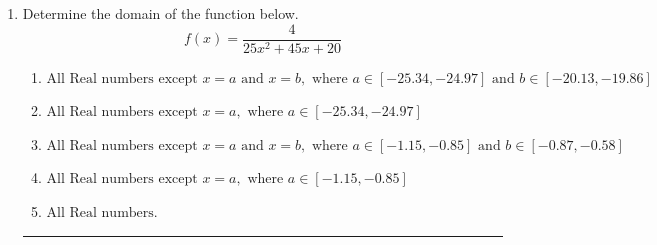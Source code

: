 \documentclass[14pt]{extbook}
\newcommand{\litem}[1]{\item#1\hspace*{-1cm}\rule{\textwidth}{0.4pt}}
\begin{document}
\begin{enumerate}
{\begin{enumerate}[label=\Alph*.]
\end{enumerate} }
\litem{
Determine the domain of the function below.\[ f(x) = \frac{4}{25x^{2} +45 x + 20} \]\begin{enumerate}[label=\Alph*.]
\item \( \text{All Real numbers except } x = a \text{ and } x = b, \text{ where } a \in [-25.34, -24.97] \text{ and } b \in [-20.13, -19.86] \)
\item \( \text{All Real numbers except } x = a, \text{ where } a \in [-25.34, -24.97] \)
\item \( \text{All Real numbers except } x = a \text{ and } x = b, \text{ where } a \in [-1.15, -0.85] \text{ and } b \in [-0.87, -0.58] \)
\item \( \text{All Real numbers except } x = a, \text{ where } a \in [-1.15, -0.85] \)
\item \( \text{All Real numbers.} \)


\end{enumerate}}
\end{enumerate}
\end{document}
